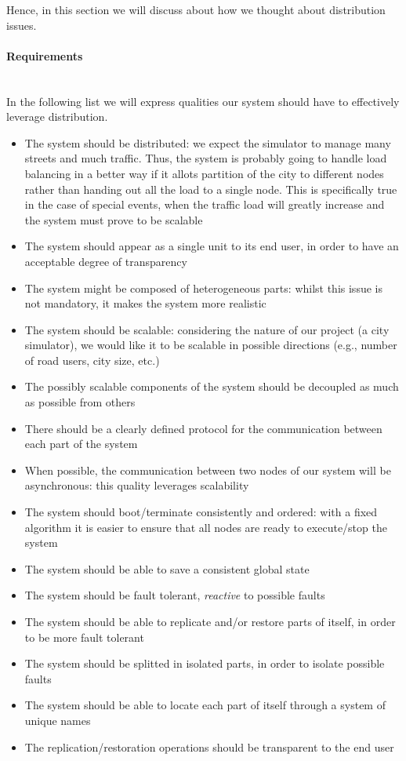 Hence, in this section we will discuss about how we thought about distribution
issues.

\paragraph{Requirements} \mbox{} \\

In the following list we will express qualities our system should have to
effectively leverage distribution.

\begin{itemize}
\item The system should be distributed: we expect the simulator to manage many
  streets and much traffic. Thus, the system is probably going to handle load
  balancing in a better way if it allots partition of the city to different
  nodes rather than handing out all the load to a single node. This is
  specifically true in the case of special events, when the traffic load will
  greatly increase and the system must prove to be scalable
\item The system should appear as a single unit to its end user, in order to
  have an acceptable degree of transparency
\item The system might be composed of heterogeneous parts: whilst this issue
  is not mandatory, it makes the system more realistic
\item The system should be scalable: considering the nature of our project (a
  city simulator), we would like it to be scalable in possible directions
  (e.g., number of road users, city size, etc.)
\item The possibly scalable components of the system should be decoupled as
  much as possible from others
\item There should be a clearly defined protocol for the communication between
  each part of the system
\item When possible, the communication between two nodes of our system will be
  asynchronous: this quality leverages scalability
\item The system should boot/terminate consistently and ordered: with a fixed
  algorithm it is easier to ensure that all nodes are ready to execute/stop the
  system
\item The system should be able to save a consistent global state
\item The system should be fault tolerant, \emph{reactive} to possible faults
\item The system should be able to replicate and/or restore parts of itself,
  in order to be more fault tolerant
\item The system should be splitted in isolated parts, in order to isolate
  possible faults
\item The system should be able to locate each part of itself through a system
  of unique names
\item The replication/restoration operations should be transparent to the end
  user
\end{itemize}

